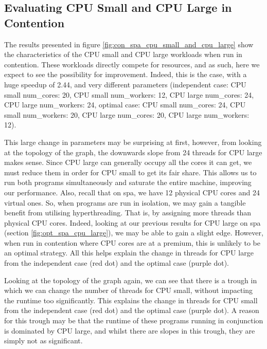 \subsection{Evaluating CPU Small and CPU Large in Contention}
\label{section:results:evaluating_cpu_small_and_cpu_large_in_contention}

The results presented in figure \ref{fig:con_spa_cpu_small_and_cpu_large} show the characteristics of the CPU small and CPU large workloads when run in contention. These workloads directly compete for resources, and as such, here we expect to see the possibility for improvement. Indeed, this is the case, with a huge speedup of 2.44, and very different parameters (independent case: CPU small num\_cores: 20, CPU small num\_workers: 12, CPU large num\_cores: 24, CPU large num\_workers: 24, optimal case: CPU small num\_cores: 24, CPU small num\_workers: 20, CPU large num\_cores: 20, CPU large num\_workers: 12).

This large change in parameters may be surprising at first, however, from looking at the topology of the graph, the downwards slope from 24 threads for CPU large makes sense. Since CPU large can generally occupy all the cores it can get, we must reduce them in order for CPU small to get its fair share. This allows us to run both programs simultaneously and saturate the entire machine, improving our performance. Also, recall that on spa, we have 12 physical CPU cores and 24 virtual ones. So, when programs are run in isolation, we may gain a tangible benefit from utilising hyperthreading. That is, by assigning more threads than physical CPU cores. Indeed, looking at our previous results for CPU large on spa (section \ref{fig:opt_spa_cpu_large}), we may be able to gain a slight edge. However, when run in contention where CPU cores are at a premium, this is unlikely to be an optimal strategy. All this helps explain the change in threads for CPU large from the independent case (red dot) and the optimal case (purple dot).

Looking at the topology of the graph again, we can see that there is a trough in which we can change the number of threads for CPU small, without impacting the runtime too significantly. This explains the change in threads for CPU small from the independent case (red dot) and the optimal case (purple dot). A reason for this trough may be that the runtime of these programs running in conjunction is dominated by CPU large, and whilst there are slopes in this trough, they are simply not as significant.

